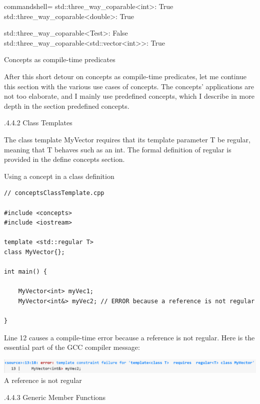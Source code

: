 \begin{tcblisting}{commandshell={}}
std::three_way_coparable<int>: True
std::three_way_coparable<double>: True

std::three_way_coparable<Test>: False
std::three_way_coparable<std::vector<int>>: True
\end{tcblisting}

\begin{center}
Concepts as compile-time predicates
\end{center}

After this short detour on concepts as compile-time predicates, let me continue this section with the various use cases of concepts. The concepts’ applications are not too elaborate, and I mainly use predefined concepts, which I describe in more depth in the section predefined concepts.

.4.4.2\hspace{0.2cm} Class Templates

The class template MyVector requires that its template parameter T be regular, meaning that T behaves such as an int. The formal definition of regular is provided in the define concepts section.

\noindent
Using a concept in a class definition
\begin{lstlisting}[style=styleCXX]
// conceptsClassTemplate.cpp

#include <concepts>
#include <iostream>

template <std::regular T>
class MyVector{};

int main() {

	MyVector<int> myVec1;
	MyVector<int&> myVec2; // ERROR because a reference is not regular

}
\end{lstlisting}

Line 12 causes a compile-time error because a reference is not regular. Here is the essential part of the GCC compiler message:

\begin{center}
\includegraphics[width=1.0\textwidth]{content/3/chapter4/images/1-3.png}\\
A reference is not regular
\end{center}


.4.4.3\hspace{0.2cm} Generic Member Functions


